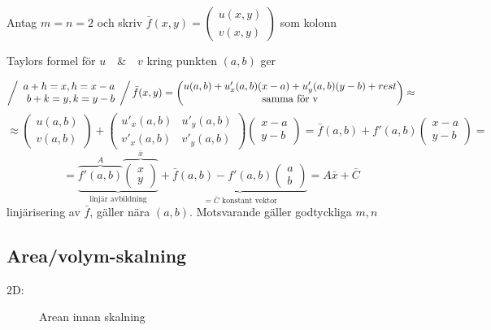 \documentclass[a4paper]{article}
\begin{document}
Antag \(m=n=2\) och skriv \(\bar{f}(x,y) =
\begin{pmatrix}
	u(x,y) \\
	v(x,y)
\end{pmatrix}\)
som kolonn \newline

Taylors formel för \(u \quad\&\quad v\) kring punkten \((a,b)\) ger

\[
\left/\begin{array}{rcl}
	a+h = x, h = x-a \\
	b+k = y, k = y-b
\end{array}\right/
\bar{f}(x,y) =
\begin{pmatrix}
	u(a,b) + u'_x(a,b)(x-a) + u'_y(a,b)(y-b) + rest \\
	\text{samma för v}
\end{pmatrix} \approx
\]
\[
\approx
\begin{pmatrix}
	u(a,b) \\
	v(a,b)
\end{pmatrix}
+
\begin{pmatrix}
	u'_x(a,b) & u'_y(a,b) \\
	v'_x(a,b) & v'_y(a,b)
\end{pmatrix}
\begin{pmatrix}
	x-a \\
	y-b
\end{pmatrix}
= \bar{f}(a,b) + f'(a,b)
\begin{pmatrix}
	x-a \\
	y-b
\end{pmatrix} =
\]
\[
	= \underbrace{\overbrace{f'(a,b)}^{A}\overbrace{
	\begin{pmatrix}
		x \\
		y
	\end{pmatrix}}^{\bar{x}}}_{\text{linjär avbildning}}
	+ \underbrace{\bar{f}(a,b) - f'(a,b)
	\begin{pmatrix}
		a \\
		b
	\end{pmatrix}}_{=\bar{C}\text{ konstant vektor}}
	= A\bar{x} + \bar{C}
\]
linjärisering av \(\bar{f}\), gäller nära \((a,b)\). Motsvarande gäller godtyckliga \(m,n\)

\subsection{Area/volym-skalning}
2D:

\begin{figure}[ht]
\usetikzlibrary{patterns}
  \caption{Arean innan skalning} \label{fig:7.1}
\end{figure}
\end{document}
